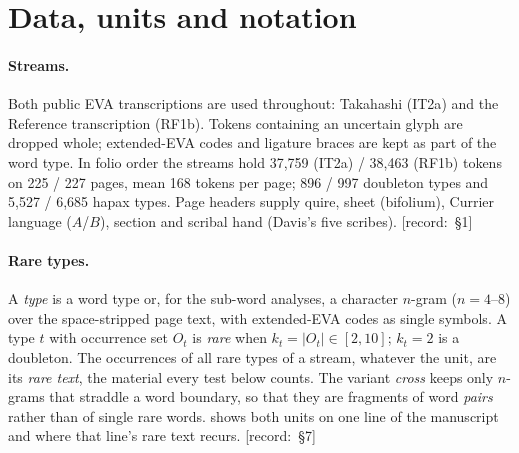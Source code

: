 \documentclass[11pt,a4paper]{article}
\newcommand{\src}[1]{{\footnotesize\color{muted}\sffamily\mbox{[record: \S#1]}}}
\newcommand{\IT}{\textcolor{it2a}{IT2a}}
\newcommand{\RF}{\textcolor{rf1b}{RF1b}}
\begin{document}
\section{Data, units and notation}
\label{sec:data}

\paragraph{Streams.} Both public EVA transcriptions are used throughout: Takahashi (\IT) and the Reference transcription (\RF). Tokens containing an uncertain glyph are dropped whole; extended-EVA codes and ligature braces are kept as part of the word type. In folio order the streams hold 37,759 (\IT) / 38,463 (\RF) tokens on 225 / 227 pages, mean 168 tokens per page; 896 / 997 doubleton types and 5,527 / 6,685 hapax types. Page headers supply quire, sheet (bifolium), Currier language ($A$/$B$), section and scribal hand (Davis's five scribes). \src{1}

\paragraph{Rare types.} A \emph{type} is a word type or, for the sub-word analyses, a character $n$-gram ($n=4$--8) over the space-stripped page text, with extended-EVA codes as single symbols. A type $t$ with occurrence set $O_t$ is \emph{rare} when $k_t=|O_t|\in[2,10]$; $k_t=2$ is a doubleton. The occurrences of all rare types of a stream, whatever the unit, are its \emph{rare text}, the material every test below counts. The variant \emph{cross} keeps only $n$-grams that straddle a word boundary, so that they are fragments of word \emph{pairs} rather than of single rare words.  shows both units on one line of the manuscript and where that line's rare text recurs. \src{7}
\end{document}
